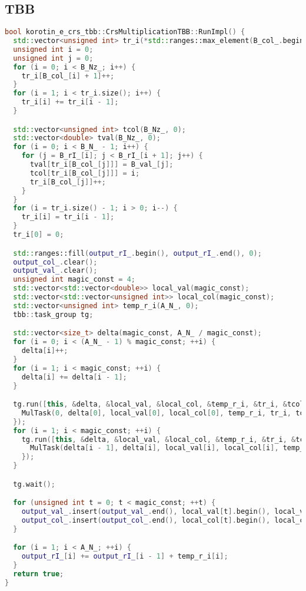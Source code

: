 \documentclass[a4paper,12pt]{article}
\begin{document}
\subsection{TBB}
\begin{lstlisting}[language=C++]
bool korotin_e_crs_tbb::CrsMultiplicationTBB::RunImpl() {
  std::vector<unsigned int> tr_i(*std::ranges::max_element(B_col_.begin(), B_col_.end()) + 2, 0);
  unsigned int i = 0;
  unsigned int j = 0;
  for (i = 0; i < B_Nz_; i++) {
    tr_i[B_col_[i] + 1]++;
  }
  for (i = 1; i < tr_i.size(); i++) {
    tr_i[i] += tr_i[i - 1];
  }

  std::vector<unsigned int> tcol(B_Nz_, 0);
  std::vector<double> tval(B_Nz_, 0);
  for (i = 0; i < B_N_ - 1; i++) {
    for (j = B_rI_[i]; j < B_rI_[i + 1]; j++) {
      tval[tr_i[B_col_[j]]] = B_val_[j];
      tcol[tr_i[B_col_[j]]] = i;
      tr_i[B_col_[j]]++;
    }
  }
  for (i = tr_i.size() - 1; i > 0; i--) {
    tr_i[i] = tr_i[i - 1];
  }
  tr_i[0] = 0;

  std::ranges::fill(output_rI_.begin(), output_rI_.end(), 0);
  output_col_.clear();
  output_val_.clear();
  unsigned int magic_const = 4;
  std::vector<std::vector<double>> local_val(magic_const);
  std::vector<std::vector<unsigned int>> local_col(magic_const);
  std::vector<unsigned int> temp_r_i(A_N_, 0);
  tbb::task_group tg;

  std::vector<size_t> delta(magic_const, A_N_ / magic_const);
  for (i = 0; i < (A_N_ - 1) % magic_const; ++i) {
    delta[i]++;
  }
  for (i = 1; i < magic_const; ++i) {
    delta[i] += delta[i - 1];
  }

  tg.run([this, &delta, &local_val, &local_col, &temp_r_i, &tr_i, &tcol, &tval] {
    MulTask(0, delta[0], local_val[0], local_col[0], temp_r_i, tr_i, tcol, tval);
  });
  for (i = 1; i < magic_const; ++i) {
    tg.run([this, &delta, &local_val, &local_col, &temp_r_i, &tr_i, &tcol, &tval, i] {
      MulTask(delta[i - 1], delta[i], local_val[i], local_col[i], temp_r_i, tr_i, tcol, tval);
    });
  }

  tg.wait();

  for (unsigned int t = 0; t < magic_const; ++t) {
    output_val_.insert(output_val_.end(), local_val[t].begin(), local_val[t].end());
    output_col_.insert(output_col_.end(), local_col[t].begin(), local_col[t].end());
  }

  for (i = 1; i < A_N_; ++i) {
    output_rI_[i] += output_rI_[i - 1] + temp_r_i[i];
  }
  return true;
}


\end{lstlisting}
\end{document}
